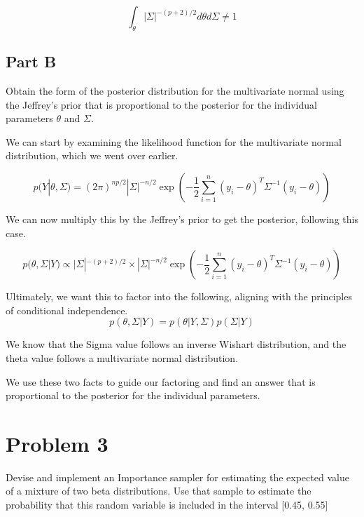 \documentclass[12pt, letterpaper]{article}
\begin{document}
\begin{equation}
  \int_{\theta} |\Sigma|^{-(p+2)/2} d\theta d\Sigma \neq 1 
\end{equation} 

\subsection{Part B}

Obtain the form of the posterior distribution for the multivariate normal using the Jeffrey's prior that is proportional to the posterior for the individual parameters $\theta$ and $\Sigma$. 

We can start by examining the likelihood function for the multivariate normal distribution, which we went over earlier. 

\begin{equation}
  p(Y | \theta, \Sigma) = (2\pi)^{np/2} |\Sigma|^{-n/2} \exp(-\frac{1}{2} \sum_{i=1}^n (y_i - \theta)^T \Sigma^{-1} (y_i - \theta)) 
\end{equation} 

We can now multiply this by the Jeffrey's prior to get the posterior, following this case. 

\begin{equation}
  p(\theta, \Sigma | Y) \propto |\Sigma|^{-(p+2)/2} \times |\Sigma|^{-n/2} \exp(-\frac{1}{2} \sum_{i=1}^n (y_i - \theta)^T \Sigma^{-1} (y_i - \theta)) 
\end{equation}

Ultimately, we want this to factor into the following, aligning with the principles of conditional independence. 
\begin{equation}
  p(\theta, \Sigma | Y) = p(\theta | Y, \Sigma) p(\Sigma | Y)
\end{equation}

We know that the Sigma value follows an inverse Wishart distribution, and the theta value follows a multivariate normal distribution. 

We use these two facts to guide our factoring and find an answer that is proportional to the posterior for the individual parameters. 

\section{Problem 3} 

Devise and implement an Importance sampler for estimating the expected value of a mixture of two beta distributions. Use that sample to estimate the probability that this random variable is included in the interval [0.45, 0.55]
\end{document}
